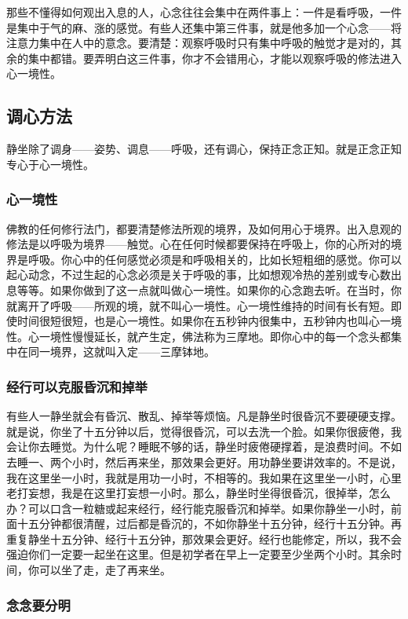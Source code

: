\documentclass{book}
\begin{document}
那些不懂得如何观出入息的人，心念往往会集中在两件事上：一件是看呼吸，一件是集中于气的麻、涨的感觉。有些人还集中第三件事，就是他多加一个心念——将注意力集中在人中的意念。要清楚：观察呼吸时只有集中呼吸的触觉才是对的，其余的集中都错。要弄明白这三件事，你才不会错用心，才能以观察呼吸的修法进入心一境性。

\subsection{调心方法}

静坐除了调身——姿势、调息——呼吸，还有调心，保持正念正知。就是正念正知专心于心一境性。

\subsubsection{心一境性}

佛教的任何修行法门，都要清楚修法所观的境界，及如何用心于境界。出入息观的修法是以呼吸为境界——触觉。心在任何时候都要保持在呼吸上，你的心所对的境界是呼吸。你心中的任何感觉必须是和呼吸相关的，比如长短粗细的感觉。你可以起心动念，不过生起的心念必须是关于呼吸的事，比如想观冷热的差别或专心数出息等等。如果你做到了这一点就叫做心一境性。如果你的心念跑去听。在当时，你就离开了呼吸——所观的境，就不叫心一境性。心一境性维持的时间有长有短。即使时间很短很短，也是心一境性。如果你在五秒钟内很集中，五秒钟内也叫心一境性。心一境性慢慢延长，就产生定，佛法称为三摩地。即你心中的每一个念头都集中在同一境界，这就叫入定——三摩钵地。

\subsubsection{经行可以克服昏沉和掉举}

有些人一静坐就会有昏沉、散乱、掉举等烦恼。凡是静坐时很昏沉不要硬硬支撑。就是说，你坐了十五分钟以后，觉得很昏沉，可以去洗一个脸。如果你很疲倦，我会让你去睡觉。为什么呢？睡眠不够的话，静坐时疲倦硬撑着，是浪费时间。不如去睡一、两个小时，然后再来坐，那效果会更好。用功静坐要讲效率的。不是说，我在这里坐一小时，我就是用功一小时，不相等的。我如果在这里坐一小时，心里老打妄想，我是在这里打妄想一小时。那么，静坐时坐得很昏沉，很掉举，怎么办？可以口含一粒糖或起来经行，经行能克服昏沉和掉举。如果你静坐一小时，前面十五分钟都很清醒，过后都是昏沉的，不如你静坐十五分钟，经行十五分钟。再重复静坐十五分钟、经行十五分钟，那效果会更好。经行也能修定，所以，我不会强迫你们一定要一起坐在这里。但是初学者在早上一定要至少坐两个小时。其余时间，你可以坐了走，走了再来坐。

\subsubsection{念念要分明}
\end{document}
